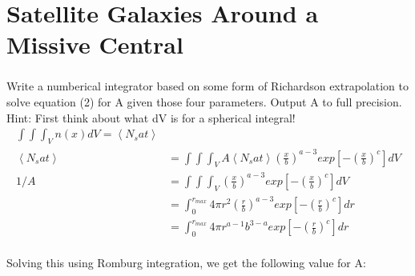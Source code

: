 \chapter{Satellite Galaxies Around a Missive Central}

\subsection{}
Write a numberical integrator based on some form of Richardson
extrapolation to solve equation (2) for A given those four parameters. Output A to full precision.
Hint: First think about what dV is for a spherical integral!
\\
\begin{align}
    \int \int \int _V n(x) dV = \left< N_sat \right>\\
    \left< N_sat \right> &= \int \int \int _V A \left< N_sat \right> \left( \frac{x}{b} \right)^{a-3} exp\left[-\left(\frac{x}{b}\right)^c\right] dV \\
    1 / A &= \int \int \int _V \left( \frac{x}{b} \right)^{a-3} exp\left[-\left(\frac{x}{b}\right)^c\right] dV \\
    &= \int_0^{r_{max}} 4 \pi r^2 \left( \frac{r}{b} \right)^{a-3} exp\left[-\left(\frac{r}{b}\right)^c\right] dr \\
    &= \int_0^{r_{max}} 4 \pi r^{a-1} b^{3-a} exp\left[-\left(\frac{r}{b}\right)^c\right] dr \\
\end{align}

Solving this using Romburg integration, we get the following value for A:
